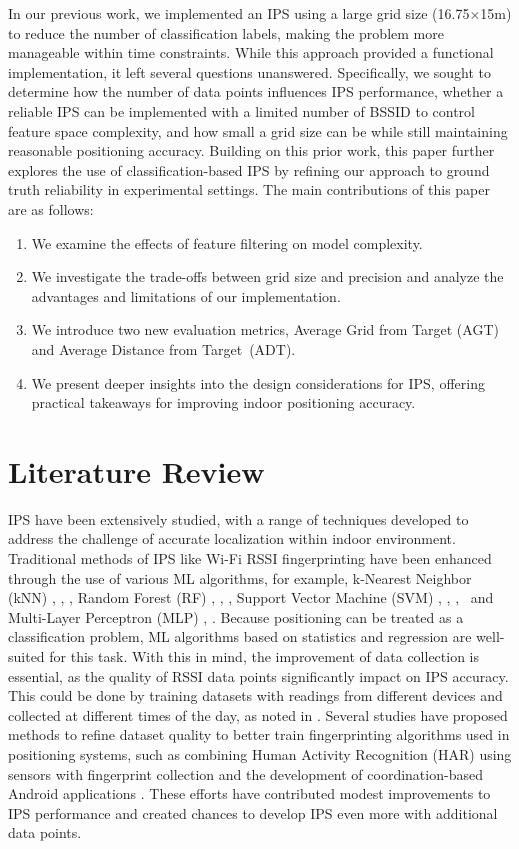 \documentclass[conference]{IEEEtran}
\begin{document}
	In our previous work, we implemented an IPS using a large grid size (16.75×15m) to reduce the number of classification labels, making the problem more manageable within time constraints. While this approach provided a functional implementation, it left several questions unanswered. Specifically, we sought to determine how the number of data points influences IPS performance, whether a reliable IPS can be implemented with a limited number of BSSID to control feature space complexity, and how small a grid size can be while still maintaining reasonable positioning accuracy.
	Building on this prior work, this paper further explores the use of classification-based IPS by refining our approach to ground truth reliability in experimental settings. The main contributions of this paper are as follows:
	\begin{enumerate}
		\item We examine the effects of feature filtering on model complexity.
		\item We investigate the trade-offs between grid size and precision and analyze the advantages and limitations of our implementation.
		\item We introduce two new evaluation metrics, Average Grid from Target (AGT) and Average Distance from Target~(ADT).
		\item We present deeper insights into the design considerations for IPS, offering practical takeaways for improving indoor positioning accuracy.
	\end{enumerate}
	
	\section{Literature Review}
	IPS have been extensively studied, with a range of techniques developed to address the challenge of accurate localization within indoor environment. Traditional methods of IPS like Wi-Fi RSSI fingerprinting have been enhanced through the use of various ML algorithms, for example, k-Nearest Neighbor (kNN) \cite{LRE1}, \cite{LRE2}, \cite{LRE6}, Random Forest (RF) \cite{LRE1}, \cite{LRE6}, \cite{LRE5}, Support Vector Machine (SVM) \cite{LRE1}, \cite{LRE2}, \cite{LRE6},~\cite{add1} and Multi-Layer Perceptron (MLP) \cite{LRE1}, \cite{LRE2}. Because positioning can be treated as a classification problem,  ML algorithms based on statistics and regression are well-suited for this task. With this in mind, the improvement of data collection is essential, as the quality of RSSI data points significantly impact on IPS accuracy. This could be done by training datasets with readings from different devices and collected at different times of the day, as noted in \cite{LRE3}. Several studies have proposed methods to refine dataset quality to better train fingerprinting algorithms used in positioning systems, such as combining Human Activity Recognition (HAR) using sensors with fingerprint collection \cite{LRE4} and the development of coordination-based Android applications \cite{LRE7}. These efforts have contributed modest improvements to IPS performance and created chances to develop IPS even more with additional data points. 
	
\end{document}
